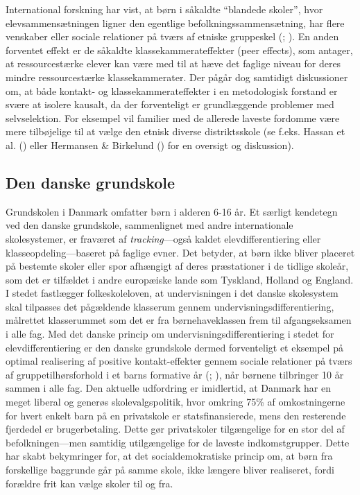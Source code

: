 \documentclass[
]{book}
\begin{document}
International forskning har vist, at børn i såkaldte ``blandede skoler'', hvor elevsammensætningen ligner den egentlige befolkningssammensætning, har flere venskaber eller sociale relationer på tværs af etniske gruppeskel (; ). En anden forventet effekt er de såkaldte klassekammerateffekter (peer effects), som antager, at ressourcestærke elever kan være med til at hæve det faglige niveau for deres mindre ressourcestærke klassekammerater. Der pågår dog samtidigt diskussioner om, at både kontakt- og klassekammerateffekter i en metodologisk forstand er svære at isolere kausalt, da der forventeligt er grundlæggende problemer med selvselektion. For eksempel vil familier med de allerede laveste fordomme være mere tilbøjelige til at vælge den etnisk diverse distriktsskole (se f.eks. Hassan et al. () eller Hermansen \& Birkelund () for en oversigt og diskussion).

\subsection{Den danske grundskole}\label{den-danske-grundskole}

Grundskolen i Danmark omfatter børn i alderen 6-16 år. Et særligt kendetegn ved den danske grundskole, sammenlignet med andre internationale skolesystemer, er fraværet af \emph{tracking}---også kaldet elevdifferentiering eller klasseopdeling---baseret på faglige evner. Det betyder, at børn ikke bliver placeret på bestemte skoler eller spor afhængigt af deres præstationer i de tidlige skoleår, som det er tilfældet i andre europæiske lande som Tyskland, Holland og England. I stedet fastlægger folkeskoleloven, at undervisningen i det danske skolesystem skal tilpasses det pågældende klasserum gennem undervisningsdifferentiering, målrettet klasserummet som det er fra børnehaveklassen frem til afgangseksamen i alle fag. Med det danske princip om undervisningsdifferentiering i stedet for elevdifferentiering er den danske grundskole dermed forventeligt et eksempel på optimal realisering af positive kontakt-effekter gennem sociale relationer på tværs af gruppetilhørsforhold i et barns formative år (; ), når børnene tilbringer 10 år sammen i alle fag. Den aktuelle udfordring er imidlertid, at Danmark har en meget liberal og generøs skolevalgspolitik, hvor omkring 75\% af omkostningerne for hvert enkelt barn på en privatskole er statsfinansierede, mens den resterende fjerdedel er brugerbetaling. Dette gør privatskoler tilgængelige for en stor del af befolkningen---men samtidig utilgængelige for de laveste indkomstgrupper. Dette har skabt bekymringer for, at det socialdemokratiske princip om, at børn fra forskellige baggrunde går på samme skole, ikke længere bliver realiseret, fordi forældre frit kan vælge skoler til og fra.
\end{document}
